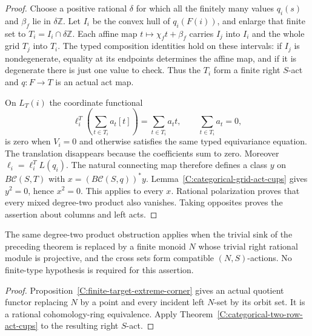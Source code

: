 \begin{proof}
Choose a positive rational $\delta$ for which all the finitely
many values $q_i(s)$ and $\beta_f$ lie in $\delta\mathbb Z$.
Let $I_i$ be the convex hull of $q_i(F(i))$, and enlarge that
finite set to $T_i=I_i\cap\delta\mathbb Z$. Each affine map
$t\mapsto\chi_ft+\beta_f$ carries $I_j$ into $I_i$ and the
whole grid $T_j$ into $T_i$. The typed composition identities
hold on these intervals: if $I_j$ is nondegenerate, equality
at its endpoints determines the affine map, and if it is
degenerate there is just one value to check. Thus the $T_i$
form a finite right $S$-act and $q:F\to T$ is an actual act map.

On $L_T(i)$ the coordinate functional
\[
 \ell_i^T\left(\sum_{t\in T_i}a_t[t]\right)=\sum_{t\in T_i}a_t t,
 \qquad \sum_{t\in T_i}a_t=0,
\]
is zero when $V_i=0$ and otherwise satisfies the same typed
equivariance equation. The translation disappears because the
coefficients sum to zero. Moreover $\ell_i=\ell_i^T L(q_i)$.
The natural connecting map therefore defines a class $y$ on
$B\mathcal C(S,T)$ with $x=(B\mathcal C(S,q))^*y$.
Lemma~\ref{C:categorical-grid-act-cups} gives $y^2=0$, hence
$x^2=0$. This applies to every $x$. Rational polarization proves
that every mixed degree-two product also vanishes. Taking
opposites proves the assertion about columns and left acts.
\end{proof}

\begin{corollary}\label{C:categorical-two-row-projective-sink}
The same degree-two product obstruction applies when the trivial
sink of the preceding theorem is replaced by a finite monoid $N$
whose trivial right rational module is projective, and the cross
sets form compatible $(N,S)$-actions. No finite-type hypothesis
is required for this assertion.
\end{corollary}
\begin{proof}
Proposition~\ref{C:finite-target-extreme-corner} gives an actual
quotient functor replacing $N$ by a point and every incident
left $N$-set by its orbit set. It is a rational cohomology-ring
equivalence. Apply Theorem~\ref{C:categorical-two-row-act-cups}
to the resulting right $S$-act.
\end{proof}

